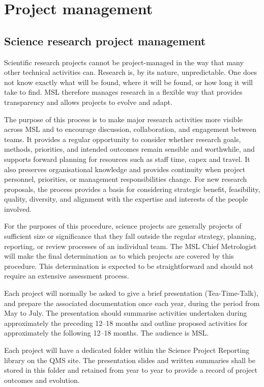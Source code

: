 \section{Project management}
\subsection{Science research project management}
Scientific research projects cannot be project-managed in the way that many other technical activities can. Research is, by its nature, unpredictable. One does not know exactly what will be found, where it will be found, or how long it will take to find. MSL therefore manages research in a flexible way that provides transparency and allows projects to evolve and adapt.

The purpose of this process is to make major research activities more visible across MSL and to encourage discussion, collaboration, and engagement between teams.  It provides a regular opportunity to consider whether research goals, methods, priorities, and intended outcomes remain sensible and worthwhile, and supports forward planning for resources such as staff time, capex and travel.  It also preserves organisational knowledge and provides continuity when project personnel, priorities, or management responsibilities change.  For new research proposals, the process provides a basis for considering strategic benefit, feasibility, quality, diversity, and alignment with the expertise and interests of the people involved.

For the purposes of this procedure, science projects are generally projects of sufficient size or significance that they fall outside the regular strategy, planning, reporting, or review processes of an individual team. The MSL Chief Metrologist will make the final determination as to which projects are covered by this procedure. This determination is expected to be straightforward and should not require an extensive assessment process.

Each project will normally be asked to give a brief presentation (Tea-Time-Talk), and prepare the associated documentation once each year, during the period from May to July. The presentation should summarise activities undertaken during approximately the preceding 12–18 months and outline proposed activities for approximately the following 12–18 months. The audience is MSL.

Each project will have a dedicated folder within the Science Project Reporting library on the QMS site. The presentation slides and written summaries shall be stored in this folder and retained from year to year to provide a record of project outcomes and evolution.

